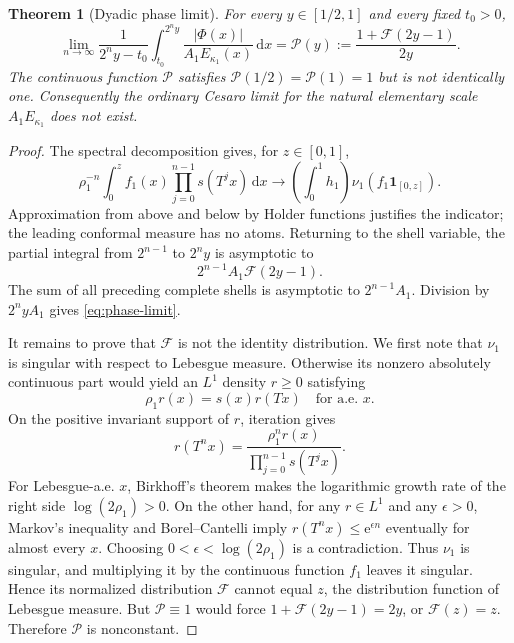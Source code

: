 \documentclass[11pt,oneside]{article}
\newtheorem{theorem}{Theorem}[section]
\theoremstyle{definition}
\theoremstyle{remark}
\newcommand{\e}{\mathrm e}
\newcommand{\dd}{\,\mathrm d}
\newcommand{\Phiup}{\Phi}
\newcommand{\abs}[1]{\left|#1\right|}
\begin{document}
\begin{theorem}[Dyadic phase limit]
\label{thm:phase-limit}
For every $y\in[1/2,1]$ and every fixed $t_0>0$,
\begin{equation}
 \lim_{n\to\infty}
 \frac1{2^ny-t_0}\int_{t_0}^{2^ny}
 \frac{\abs{\Phiup(x)}}{A_1E_{\kappa_1}(x)}\dd x
 =\mathscr P(y):=\frac{1+\mathscr F(2y-1)}{2y}.
 \label{eq:phase-limit}
\end{equation}
The continuous function $\mathscr P$ satisfies
$\mathscr P(1/2)=\mathscr P(1)=1$ but is not identically one.  Consequently the ordinary
Cesaro limit for the natural elementary scale $A_1E_{\kappa_1}$ does not exist.
\end{theorem}

\begin{proof}
The spectral decomposition gives, for $z\in[0,1]$,
\[
 \rho_1^{-n}\int_0^z f_1(x)
 \prod_{j=0}^{n-1}s(T^jx)\dd x
 \longrightarrow
 \left(\int_0^1h_1\right)\nu_1(f_1\mathbf1_{[0,z]}).
\]
Approximation from above and below by Holder functions justifies the indicator; the
leading conformal measure has no atoms.  Returning to the shell variable, the partial
integral from $2^{n-1}$ to $2^ny$ is asymptotic to
\[
 2^{n-1}A_1\mathscr F(2y-1).
\]
The sum of all preceding complete shells is asymptotic to $2^{n-1}A_1$.  Division by
$2^nyA_1$ gives \eqref{eq:phase-limit}.

It remains to prove that $\mathscr F$ is not the identity distribution.  We first note that
$\nu_1$ is singular with respect to Lebesgue measure.  Otherwise its nonzero absolutely
continuous part would yield an $L^1$ density $r\ge0$ satisfying
\begin{equation}
 \rho_1r(x)=s(x)r(Tx)
 \quad\text{for a.e. }x.
 \label{eq:conformal-density}
\end{equation}
On the positive invariant support of $r$, iteration gives
\[
 r(T^nx)=\frac{\rho_1^nr(x)}{\prod_{j=0}^{n-1}s(T^jx)}.
\]
For Lebesgue-a.e. $x$, Birkhoff's theorem makes the logarithmic growth rate of the right
side $\log(2\rho_1)>0$.  On the other hand, for any $r\in L^1$ and any $\epsilon>0$,
Markov's inequality and Borel--Cantelli imply
$r(T^nx)\le\e^{\epsilon n}$ eventually for almost every $x$.  Choosing
$0<\epsilon<\log(2\rho_1)$ is a contradiction.  Thus $\nu_1$ is singular, and multiplying
it by the continuous function $f_1$ leaves it singular.  Hence its normalized distribution
$\mathscr F$ cannot equal $z$, the distribution function of Lebesgue measure.  But
$\mathscr P\equiv1$ would force
$1+\mathscr F(2y-1)=2y$, or $\mathscr F(z)=z$.  Therefore $\mathscr P$ is nonconstant.
\end{proof}
\end{document}
